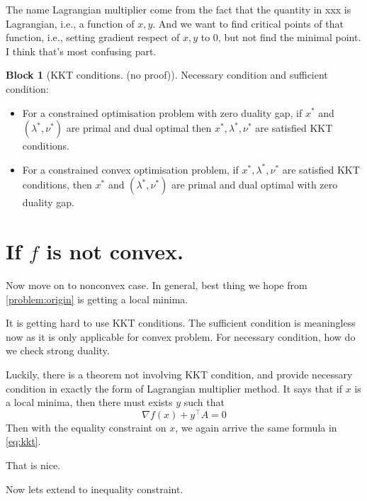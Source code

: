 \documentclass[11pt,a4paper]{article}
\newcommand{\T}{\!\top\!}
\theoremstyle{plain}
\theoremstyle{definition}
\newtheorem{block}{Block}[section]
\theoremstyle{remark}
\begin{document}
The name Lagrangian multiplier come from the fact that the quantity in xxx is Lagrangian, i.e., a function of $x, y$. And we want to find critical points of that function, i.e., setting gradient respect of $x, y$ to $0$, but not find the minimal point. I think that's most confusing part.

\begin{block}[KKT conditions. (no proof)] 
    Necessary condition and sufficient condition:
    \begin{itemize}
        \item For a constrained optimisation problem with zero duality gap, if $x^{*}$ and $(\lambda^{*}, \nu^{*})$ are primal and dual optimal then $x^{*}, \lambda^{*}, \nu^{*}$ are satisfied KKT conditions.
        \item For a constrained convex optimisation problem, if $x^{*}, \lambda^{*}, \nu^{*}$ are satisfied KKT conditions, then $x^{*}$ and $(\lambda^{*}, \nu^{*})$ are primal and dual optimal with zero duality gap.
    \end{itemize}
\end{block}
\section{If $f$ is not convex.} 
Now move on to nonconvex case. In general, best thing we hope from \eqref{problem:origin} is getting a local minima. 

It is getting hard to use KKT conditions. The sufficient condition is meaningless now as it is only applicable for convex problem. For necessary condition, how do we check strong duality.

Luckily, there is a theorem not involving KKT condition, and provide necessary condition in exactly the form of Lagrangian multiplier method.
It says that if $x$ is a local minima, then there must exists  $y$ such that
 \[
\nabla f(x) + y^{\T} A = 0
\] 
Then with the equality constraint on $x$, we again arrive the same formula in \eqref{eq:kkt}.

That is nice.

Now lets extend to inequality constraint.
\end{document}
